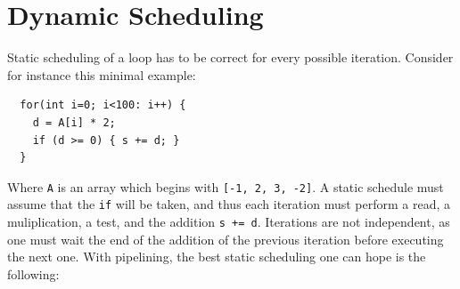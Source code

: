 \documentclass{article}
\begin{document}
\section{Dynamic Scheduling}
Static scheduling of a loop has to be correct for every possible iteration.
Consider for instance this minimal example:
\begin{lstlisting}
  for(int i=0; i<100: i++) {
    d = A[i] * 2;
    if (d >= 0) { s += d; }
  } 
\end{lstlisting}
Where \texttt{A} is an array which begins with \texttt{[-1, 2, 3, -2]}.
A static schedule must assume that the \texttt{if} will be taken, and thus each iteration must perform a read, a muliplication, a test, and the addition \texttt{s += d}. Iterations are not independent, as one must wait the end of the addition of the previous iteration before executing the next one.
With pipelining, the best static scheduling one can hope is the following:
\end{document}
